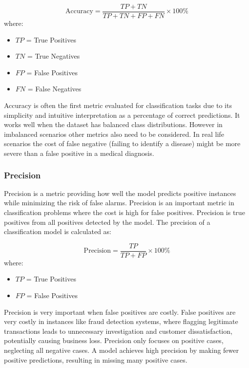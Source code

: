   \begin{equation}
    \text{Accuracy} = \frac{TP + TN}{TP + TN + FP + FN} \times 100\%
    \label{eq:accuracy}
  \end{equation}
  where:
  \begin{itemize}
    \item $TP$ = True Positives
    \item $TN$ = True Negatives
    \item $FP$ = False Positives
    \item $FN$ = False Negatives
  \end{itemize}

  Accuracy is often the first metric evaluated for classification tasks due to its simplicity and intuitive interpretation as a percentage of correct predictions. It works well when the dataset has balanced class distributions. However in imbalanced scenarios other metrics also need to be considered. In real life scenarios the cost of false negative (failing to identify a disease) might be more severe than a false positive in a medical diagnosis.

  \subsubsection{Precision}
  Precision is a metric providing how well the model predicts positive instances while minimizing the risk of false alarms. Precision is an important metric in classification problems where the cost is high for false positives. Precision is true positives from all positives detected by the model. The precision of a classification model is calculated as:

  \begin{equation}
    \text{Precision} = \frac{TP}{TP + FP} \times 100\%
    \label{eq:precision}
  \end{equation}
  where:
  \begin{itemize}
    \item $TP$ = True Positives
    \item $FP$ = False Positives
  \end{itemize}

  Precision is very important when false positives are costly. False positives are very costly in instances like fraud detection systems, where flagging legitimate transactions leads to unnecessary investigation and customer dissatisfaction, potentially causing business loss. Precision only focuses on positive cases, neglecting all negative cases. A model achieves high precision by making fewer positive predictions, resulting in missing many positive cases.

